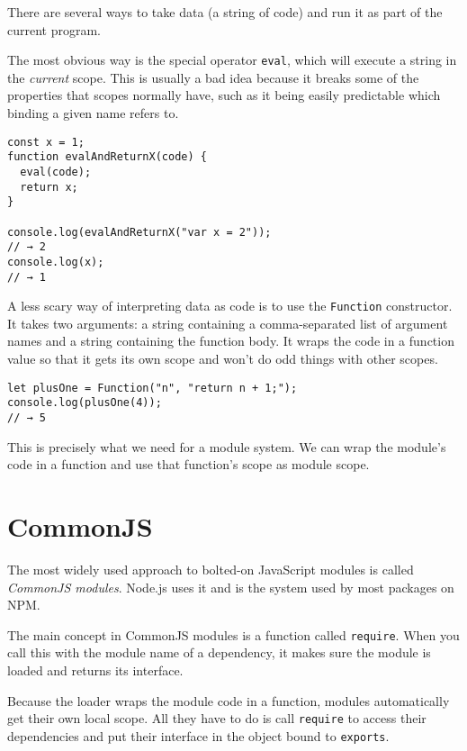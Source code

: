 There are several ways to take data (a string of code) and run it as part of the current program.

The most obvious way is the special operator \lstinline`eval`, which will execute a string in the \emph{current} scope. This is usually a bad idea because it breaks some of the properties that scopes normally have, such as it being easily predictable which binding a given name refers to.

\begin{lstlisting}
const x = 1;
function evalAndReturnX(code) {
  eval(code);
  return x;
}

console.log(evalAndReturnX("var x = 2"));
// → 2
console.log(x);
// → 1
\end{lstlisting}
\noindent{}

A less scary way of interpreting data as code is to use the \lstinline`Function` constructor. It takes two arguments: a string containing a comma-separated list of argument names and a string containing the function body. It wraps the code in a function value so that it gets its own scope and won't do odd things with other scopes.

\begin{lstlisting}
let plusOne = Function("n", "return n + 1;");
console.log(plusOne(4));
// → 5
\end{lstlisting}
\noindent

This is precisely what we need for a module system. We can wrap the module's code in a function and use that function's scope as module scope.

\section{CommonJS}

\label{modules.commonjs}The most widely used approach to bolted-on JavaScript modules is called \emph{CommonJS modules}. Node.js uses it and is the system used by most packages on NPM.

The main concept in CommonJS modules is a function called \lstinline`require`. When you call this with the module name of a dependency, it makes sure the module is loaded and returns its interface.

Because the loader wraps the module code in a function, modules automatically get their own local scope. All they have to do is call \lstinline`require` to access their dependencies and put their interface in the object bound to \lstinline`exports`.

